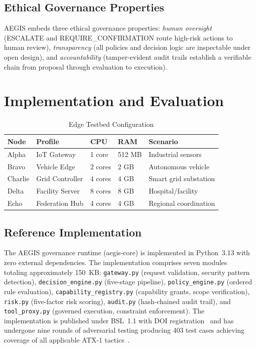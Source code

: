 \documentclass[journal]{IEEEtran}
\begin{document}
\subsection{Ethical Governance Properties}

AEGIS embeds three ethical governance properties: \textit{human oversight} (ESCALATE and REQUIRE\_CONFIRMATION route high-risk actions to human review), \textit{transparency} (all policies and decision logic are inspectable under open design), and \textit{accountability} (tamper-evident audit trails establish a verifiable chain from proposal through evaluation to execution).

\section{Implementation and Evaluation}

\begin{table}[t]
\centering
\caption{Edge Testbed Configuration}
\label{tab:testbed}
\begin{tabular}{@{}lllll@{}}
\toprule
\textbf{Node} & \textbf{Profile} & \textbf{CPU} & \textbf{RAM} & \textbf{Scenario} \\
\midrule
Alpha & IoT Gateway & 1 core & 512 MB & Industrial sensors \\
Bravo & Vehicle Edge & 2 cores & 2 GB & Autonomous vehicle \\
Charlie & Grid Controller & 4 cores & 4 GB & Smart grid substation \\
Delta & Facility Server & 8 cores & 8 GB & Hospital/facility \\
Echo & Federation Hub & 4 cores & 4 GB & Regional coordination \\
\bottomrule
\end{tabular}
\end{table}

\subsection{Reference Implementation}

The AEGIS governance runtime (aegis-core) is implemented in Python~3.13 with zero external dependencies. The implementation comprises seven modules totaling approximately 150~KB: \texttt{gateway.py} (request validation, security pattern detection), \texttt{decision\_engine.py} (five-stage pipeline), \texttt{policy\_engine.py} (ordered rule evaluation), \texttt{capability\_registry.py} (capability grants, scope verification), \texttt{risk.py} (five-factor risk scoring), \texttt{audit.py} (hash-chained audit trail), and \texttt{tool\_proxy.py} (governed execution, constraint enforcement). The implementation is published under BSL~1.1 with DOI registration~\cite{aegis_core_doi} and has undergone nine rounds of adversarial testing producing 403 test cases achieving coverage of all applicable ATX-1 tactics~\cite{aegis_security_testing}.
\end{document}
